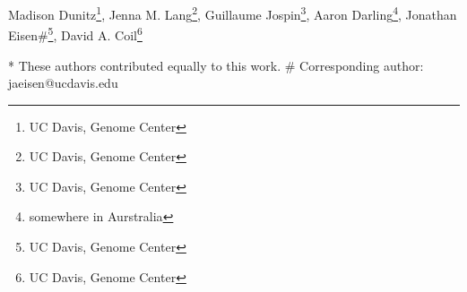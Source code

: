 Madison Dunitz\*\footnote{UC Davis, Genome Center}, Jenna M. Lang\*\footnote{UC Davis, Genome Center}, Guillaume Jospin\footnote{UC Davis, Genome Center}, Aaron Darling\footnote{somewhere in Aurstralia}, Jonathan Eisen\#\footnote{UC Davis, Genome Center}, David A. Coil\footnote{UC Davis, Genome Center} 

* These authors contributed equally to this work.
\# Corresponding author: jaeisen@ucdavis.edu